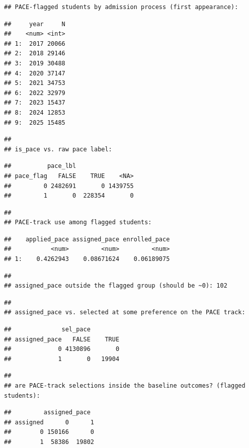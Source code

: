 \documentclass[
]{article}
\begin{document}
\begin{verbatim}
## PACE-flagged students by admission process (first appearance):
\end{verbatim}

\begin{verbatim}
##     year     N
##    <num> <int>
## 1:  2017 20066
## 2:  2018 29146
## 3:  2019 30488
## 4:  2020 37147
## 5:  2021 34753
## 6:  2022 32979
## 7:  2023 15437
## 8:  2024 12853
## 9:  2025 15485
\end{verbatim}

\begin{verbatim}
## 
## is_pace vs. raw pace label:
\end{verbatim}

\begin{verbatim}
##          pace_lbl
## pace_flag   FALSE    TRUE    <NA>
##         0 2482691       0 1439755
##         1       0  228354       0
\end{verbatim}

\begin{verbatim}
## 
## PACE-track use among flagged students:
\end{verbatim}

\begin{verbatim}
##    applied_pace assigned_pace enrolled_pace
##           <num>         <num>         <num>
## 1:    0.4262943    0.08671624    0.06189075
\end{verbatim}

\begin{verbatim}
## 
## assigned_pace outside the flagged group (should be ~0): 102
\end{verbatim}

\begin{verbatim}
## 
## assigned_pace vs. selected at some preference on the PACE track:
\end{verbatim}

\begin{verbatim}
##              sel_pace
## assigned_pace   FALSE    TRUE
##             0 4130896       0
##             1       0   19904
\end{verbatim}

\begin{verbatim}
## 
## are PACE-track selections inside the baseline outcomes? (flagged students):
\end{verbatim}

\begin{verbatim}
##         assigned_pace
## assigned      0      1
##        0 150166      0
##        1  58386  19802
\end{verbatim}
\end{document}
